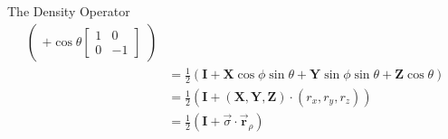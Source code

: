\documentclass{beamer}
\begin{document}
\begin{frame}{The Density Operator\tiny\cite{rotationsonblochsphere}}
{\begin{align*}
\begin{pmatrix}
                +
                \cos\theta
                \begin{bmatrix}
                  1 & 0 \\
                  0 & -1 
                \end{bmatrix}
              \end{pmatrix} \\
            &= \frac{1}2(\mathbf{I} + \mathbf{X}\cos\phi\sin\theta + \mathbf{Y}\sin\phi\sin\theta + \mathbf{Z}\cos\theta) \\
            &= \frac{1}2(\mathbf{I} + (\mathbf{X}, \mathbf{Y}, \mathbf{Z}) \cdot (r_x, r_y, r_z)) \\
            &= \frac{1}2 ( \mathbf{I} + \overrightarrow{\sigma} \cdot \overrightarrow{\mathbf{r}}_{\rho} )
    \end{align*}
  }%
\end{frame}
\end{document}
